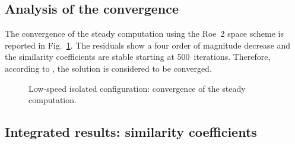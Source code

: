 
\subsection{Analysis of the convergence}
\label{sub:dream_ls_conv_coeff}

The convergence of the steady computation using the Roe~2 space scheme
is reported in Fig.~\ref{fig:dream_ls_convergence_roe2}. The residuals
show a four order of magnitude decrease and the similarity
coefficients are stable starting at 500~iterations.
Therefore, according to \citet{Casey2000}, the
solution is considered to be converged.
\begin{figure}[htp]
  \centering
  \caption{Low-speed isolated configuration: convergence of the steady
  computation.}
  \label{fig:dream_ls_convergence_roe2}
\end{figure}

\subsection{Integrated results: similarity coefficients}
\label{sub:dream_ls_sim_coeff}

